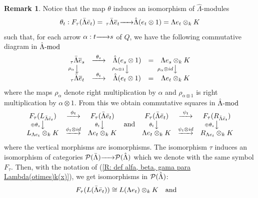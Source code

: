 \documentclass{article}
\theoremstyle{definition}
\newtheorem{remark}[theorem]{Remark}
\newcommand{\g}{\hbox{-}}
\renewcommand{\mod}{{\rm mod }}
\newcommand{\rightmap}[1]{\smash{\mathop{\hbox to 
20pt{\rightarrowfill}}\limits^{#1}}}
\newcommand{\shortlmapdown}[1]
{\llap{$\vcenter{\hbox{$\scriptstyle#1$}}$}\big\downarrow}
\begin{document}
\begin{remark}
Notice that the map $\theta$ induces an isomorphism of $\hat{\Lambda}$-modules $$\theta_t:F_\tau(\bar{\Lambda}\bar{e}_t)={\,}_\tau\bar{\Lambda}\overline{e}_t\rightmap{}\hat{\Lambda}(e_t\otimes 1)=\Lambda e_t\otimes_kK$$
such that, for each arrow $\alpha:t\rightmap{}s$ of $Q$, we have the following commutative diagram in $\hat{\Lambda}\g\mod$
$$\begin{matrix}
{\,}_\tau\bar{\Lambda}\overline{e}_s&\rightmap{\theta_s}&\hat{\Lambda}(e_s\otimes 1)&=&\Lambda e_s\otimes_kK\\
\shortlmapdown{\rho_\alpha}&&\shortlmapdown{\rho_{\alpha\otimes 1}}&&\shortlmapdown{\rho_\alpha\otimes id}\\
{\,}_\tau\bar{\Lambda}\overline{e}_t&\rightmap{\theta_t}&\hat{\Lambda}(e_t\otimes 1)&=&\Lambda e_t\otimes_k K\\
\end{matrix}$$
where the maps $\rho_\alpha$ denote right multiplication by $\alpha$ and 
$\rho_{\alpha\otimes 1}$ is right multiplication by $\alpha\otimes 1$.   
From this we obtain commutative squares in $\hat{\Lambda}\g\mod$
$$\begin{matrix}
\begin{matrix}
F_\tau(L_{\bar{\Lambda}\bar{e}_t})&
\rightmap{\bar{\phi}_t}&F_\tau(\bar{\Lambda}\bar{e}_t)\\
\shortlmapdown{\oplus \theta_s}&&\shortlmapdown{\theta_t}\\
L_{\Lambda e_t}\otimes_kK &\rightmap{\phi_t\otimes id}&\Lambda e_t\otimes_k K\\
\end{matrix}
\hbox{ \ \ and \ \  }
\begin{matrix}
F_\tau(\bar{\Lambda}\bar{e}_t)
&
\rightmap{\bar{\psi}_t}&F_\tau(R_{\bar{\Lambda}\bar{e}_t})\\
\shortlmapdown{\theta_t}&&\shortlmapdown{\oplus \theta_s}\\
\Lambda e_t\otimes_kK&\rightmap{\psi_t\otimes id}&R_{\Lambda e_t}\otimes_k K\\
\end{matrix}
\end{matrix}$$ 
where the vertical morphisms are isomorphisms. The isomorphism $\tau$ induces an isomorphism of categories
 ${\cal P}(\bar{\Lambda})\rightmap{}{\cal P}(\hat{\Lambda})$ which we denote with the same symbol $F_\tau$. Then, with the notation of (\ref{R: def alfa, beta, gama para Lambda(otimes)k(x)}), we get isomorphisms in ${\cal P}(\hat{\Lambda})$: 
$$F_\tau(L(\bar{\Lambda}\bar{e}_t))\cong  
L(\Lambda e_t)\otimes_k K \hbox{ \ \ and \ \ }
$$
\end{remark}
\end{document}

